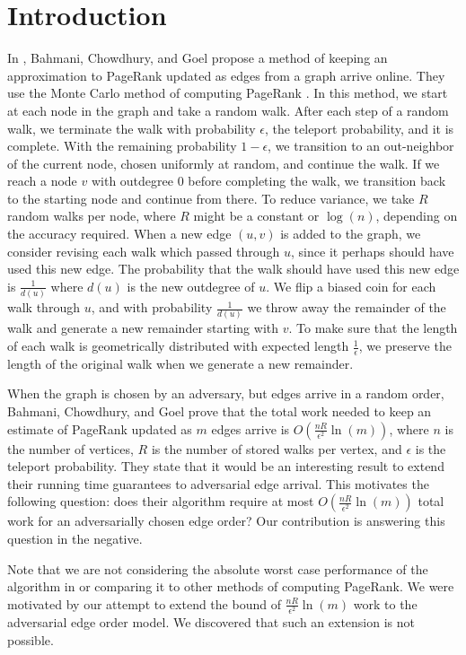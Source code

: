 \documentclass{article}
\newcommand{\pn}[1]{\left( #1 \right)}
\begin{document}
\section{Introduction}
In \cite{incremental_pagerank}, Bahmani, Chowdhury, and Goel propose a method of keeping an approximation to PageRank updated as edges from a graph arrive online.  They use the Monte Carlo method of computing PageRank \cite{monte_carlo_pagerank}.  In this method, we start at each node in the graph and take a random walk.  After each step of a random walk, we terminate the walk with probability $\epsilon$, the teleport probability, and it is complete.  With the remaining probability $1- \epsilon$, we transition to an out-neighbor of the current node, chosen uniformly at random, and continue the walk.  If we reach a node $v$ with outdegree 0 before completing the walk, we transition back to the starting node and continue from there.  To reduce variance, we take $R$ random walks per node, where $R$ might be a constant or $\log(n)$, depending on the accuracy required.  When a new edge $(u,v)$ is added to the graph, we consider revising each walk which passed through $u$, since it perhaps should have used this new edge.  The probability that the walk should have used this new edge is $\frac{1}{d(u)}$ where $d(u)$ is the new outdegree of $u$.  We flip a biased coin for each walk through $u$, and with probability  $\frac{1}{d(u)}$ we throw away the remainder of the walk and generate a new remainder starting with $v$.  To make sure that the length of each walk is geometrically distributed with expected length $\frac{1}{\epsilon}$, we preserve the length of the original walk when we generate a new remainder. 

When the graph is chosen by an adversary, but edges arrive in a random order, Bahmani, Chowdhury, and Goel \cite{incremental_pagerank} prove that the total work needed to keep an estimate of PageRank updated as $m$ edges arrive is $O \pn{\frac{nR}{\epsilon^2} \ln(m)}$, where $n$ is the number of vertices, $R$ is the number of stored walks per vertex, and $\epsilon$ is the teleport probability.   They state that it would be an interesting result to extend their running time guarantees to adversarial edge arrival.  This motivates the following question: does their algorithm require at most $O \pn{\frac{nR}{\epsilon^2} \ln(m)}$ total work for an adversarially chosen edge order? Our contribution is answering this question in the negative.

Note that we are not considering the absolute worst case performance of the algorithm in \cite{incremental_pagerank} or comparing it to other methods of computing PageRank.  We were motivated by our attempt to extend the bound of $\frac{nR}{\epsilon^2} \ln(m)$ work to the adversarial edge order model.  We discovered that such an extension is not possible.
\end{document}

